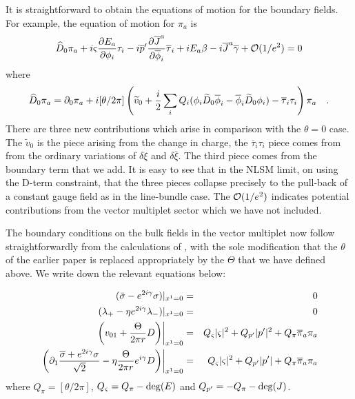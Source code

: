 \documentclass[a4paper,12pt]{article}
\begin{document}
It is straightforward to obtain the equations of motion for the
boundary fields. For example, the equation of motion for $\pi_a$
is
\begin{equation}
\widehat{D}_0 \pi_a + i
\varsigma{{\partial E_a}\over{\partial\phi_i}} \tau_i
-i \overline{p}'{{\partial
\overline{J}^a}\over{\partial\overline{\phi}_i}}
\overline{\tau}_i+iE_a \beta
-i \overline{J}^a \overline{\gamma} +{\cal O}(1/e^2)=0
\end{equation}
where 
$$
\widehat{D}_0 \pi_a = \partial_0 \pi_a + i [\theta/2\pi]
\left(\widetilde{v}_0 + {i\over 2}\sum_i Q_i(\phi_i
\widetilde{D}_0\overline{\phi}_i - \overline{\phi}_i
\widetilde{D}_0 \phi_i) - \overline{\tau}_i\tau_i \right) \pi_a \quad.
$$
There are three new contributions which arise in comparison with the
$\theta=0$ case. The $\widetilde{v}_0$ is the piece arising from
the change in charge, the $\overline{\tau}_i\tau_i$ piece comes from
from the ordinary variations of $\delta\xi$ and $\delta\overline{\xi}$.
The third piece comes from the boundary term that we add. It is easy to
see that in the NLSM limit, on using the D-term constraint, that the
three pieces collapse precisely to the pull-back of a constant gauge
field as in the line-bundle case\cite{HIV}. The ${\cal O}(1/e^2)$
indicates potential contributions from the vector multiplet sector  which we
have not included.

The boundary conditions on the bulk fields in the vector multiplet
now follow straightforwardly
from the calculations of \cite{lsmone}, with the sole modification that
the $\theta$ of the earlier paper is replaced appropriately by the
$\Theta$ that we have defined above. We write down the relevant
equations below:

\begin{eqnarray}
({\bar\sigma}-e^{2i\gamma}\sigma)|_{x^1=0}&=&0\\
({\lambda_{+}}-\eta e^{2i\gamma}\lambda_{-})|_{x^1=0}&=&0 \\
\left.\left(v_{01}+
{\Theta\over{2\pi r}}D\right)\right|_{x^1=0}&=&Q_\varsigma |\varsigma|^2
+ Q_{p'} |p'|^2 + Q_\pi \overline{\pi}_a \pi_a \\
\left.\left(\partial_1{{\overline{\sigma} + e^{2i\gamma}
\sigma}\over{\sqrt2}}
-\eta {{\Theta}\over{2\pi r}} 
e^{i\gamma} D\right)\right|_{x^1=0} &=&Q_\varsigma |\varsigma|^2 +
Q_{p'} |p'| + Q_\pi \overline{\pi}_a \pi_a 
\end{eqnarray}
where $Q_\pi=[\theta/2\pi]$, $Q_\varsigma = Q_\pi - {\rm deg}(E)$ and
$Q_{p'}=-Q_\pi -{\rm deg}(J)$.
\end{document}
